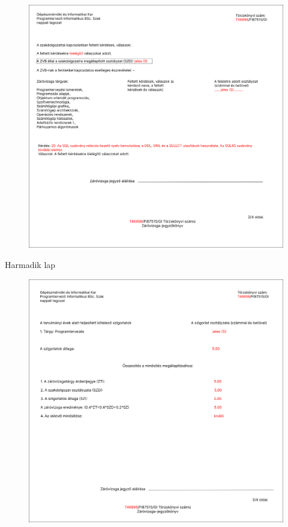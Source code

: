 \documentclass[a4paper,12pt]{article}
\begin{document}
\begin{figure}
	\centering
	\includegraphics[width=\textwidth]{images/Web_pages/Zv_Report2.png}
	\caption{}
	\label{fig:Zv_Report2}
\end{figure}

Harmadik lap

\begin{figure}
	\centering
	\includegraphics[width=\textwidth]{images/Web_pages/Zv_Report3.png}
	\caption{}
	\label{fig:Zv_Report3}
\end{figure}
\end{document}
